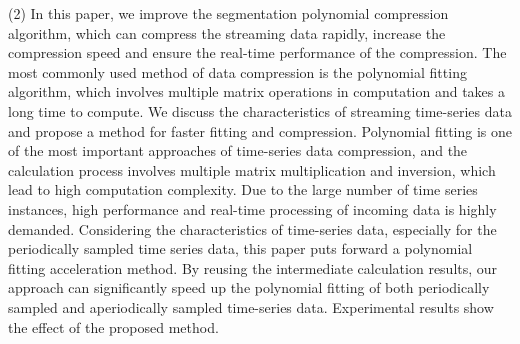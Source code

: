 \begin{englishabstract}
 (2) In this paper, we improve the segmentation polynomial compression algorithm, which can compress the streaming data rapidly, increase the compression speed and ensure the real-time performance of the compression. The most commonly used method of data compression is the polynomial fitting algorithm, which involves multiple matrix operations in computation and takes a long time to compute. We discuss the characteristics of streaming time-series data and propose a method for faster fitting and compression. Polynomial fitting is one of the most important approaches of time-series data compression, and the calculation process involves multiple matrix multiplication and inversion, which lead to high computation complexity. Due to the large number of time series instances, high performance and real-time processing of incoming data is highly demanded. Considering the characteristics of time-series data, especially for the periodically sampled time series data, this paper puts forward a polynomial fitting acceleration method. By reusing the intermediate calculation results, our approach can significantly speed up the polynomial fitting of both periodically sampled and aperiodically sampled time-series data. Experimental results show the effect of the proposed method.
  

\end{englishabstract}
